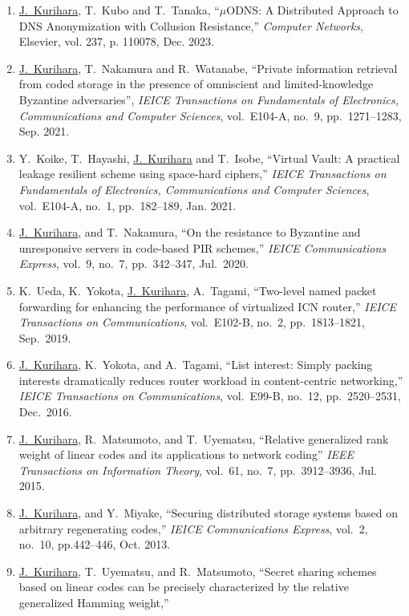 \begin{enumerate}
 \item \underline{J.~Kurihara}, T.~Kubo and T.~Tanaka, ``$\mu$ODNS: A Distributed Approach to DNS Anonymization with Collusion Resistance,'' \textit{Computer Networks}, Elsevier, vol. 237, p. 110078, Dec. 2023.
 \item \underline{J.~Kurihara}, T.~Nakamura and R.~Watanabe, ``Private information retrieval from coded storage in the presence of omniscient and limited-knowledge Byzantine adversaries'', \textit{IEICE Transactions on Fundamentals of Electronics, Communications and Computer Sciences}, vol.~E104-A, no.~9, pp.~1271--1283, Sep. 2021.
 \item Y.~Koike, T.~Hayashi, \underline{J.~Kurihara} and T.~Isobe, ``Virtual Vault: A practical leakage resilient scheme using space-hard ciphers,'' \textit{IEICE Transactions on Fundamentals of Electronics, Communications and Computer Sciences}, vol.~E104-A, no.~1, pp.~182--189, Jan. 2021.
 \item \underline{J.~Kurihara}, and T.~Nakamura, ``On the resistance to Byzantine and unresponsive servers in code-based PIR schemes,'' \textit{IEICE Communications Express}, vol.~9, no.~7, pp.~342--347, Jul.~2020.
 \item K.~Ueda, K.~Yokota, \underline{J.~Kurihara}, A.~Tagami, ``Two-level named packet forwarding for enhancing the performance of virtualized ICN router,'' \textit{IEICE Transactions on Communications}, vol.~E102-B, no.~2, pp.~1813--1821, Sep.~2019.
 \item \underline{J.~Kurihara}, K.~Yokota, and A.~Tagami, ``List interest: Simply packing interests dramatically reduces router workload in content-centric networking,'' \textit{IEICE Transactions on Communications}, vol.~E99-B, no.~12, pp.~2520--2531, Dec.~2016.
 \item \underline{J.~Kurihara}, R.~Matsumoto, and T.~Uyematsu, ``Relative generalized rank weight of linear codes and its applications to network coding'' \textit{IEEE Transactions on Information Theory}, vol.~61, no.~7, pp.~3912--3936, Jul. 2015.
 \item \underline{J.~Kurihara}, and Y.~Miyake, ``Securing distributed storage systems based on arbitrary regenerating codes,'' \textit{IEICE Communications Express}, vol.~2, no.~10, pp.442--446, Oct. 2013.
 \item \underline{J.~Kurihara}, T.~Uyematsu, and R.~Matsumoto,
       ``Secret sharing schemes based on linear codes can be precisely
       characterized by the relative generalized Hamming weight,''

\end{enumerate}
